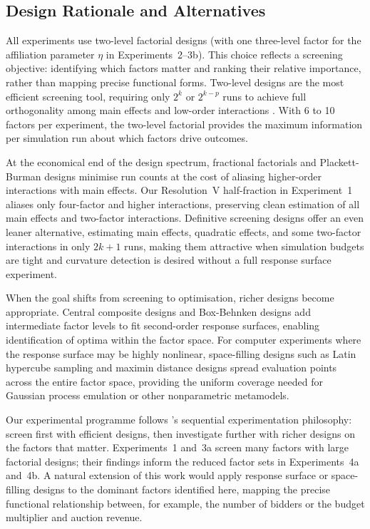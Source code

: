 \subsection{Design Rationale and Alternatives}

All experiments use two-level factorial designs (with one three-level factor for the affiliation parameter $\eta$ in Experiments~2--3b). This choice reflects a screening objective: identifying which factors matter and ranking their relative importance, rather than mapping precise functional forms. Two-level designs are the most efficient screening tool, requiring only $2^k$ or $2^{k-p}$ runs to achieve full orthogonality among main effects and low-order interactions \citep{Box2005, Montgomery2017}. With 6 to 10 factors per experiment, the two-level factorial provides the maximum information per simulation run about which factors drive outcomes.

At the economical end of the design spectrum, fractional factorials and Plackett-Burman designs minimise run counts at the cost of aliasing higher-order interactions with main effects. Our Resolution~V half-fraction in Experiment~1 aliases only four-factor and higher interactions, preserving clean estimation of all main effects and two-factor interactions. Definitive screening designs \citep{JonesNachtsheim2011} offer an even leaner alternative, estimating main effects, quadratic effects, and some two-factor interactions in only $2k+1$ runs, making them attractive when simulation budgets are tight and curvature detection is desired without a full response surface experiment.

When the goal shifts from screening to optimisation, richer designs become appropriate. Central composite designs \citep{BoxWilson1951} and Box-Behnken designs \citep{BoxBehnken1960} add intermediate factor levels to fit second-order response surfaces, enabling identification of optima within the factor space. For computer experiments where the response surface may be highly nonlinear, space-filling designs such as Latin hypercube sampling \citep{McKayBeckmanConover1979} and maximin distance designs \citep{SantnerWilliamsNotz2018} spread evaluation points across the entire factor space, providing the uniform coverage needed for Gaussian process emulation or other nonparametric metamodels.

Our experimental programme follows \citeauthor{Box2005}'s sequential experimentation philosophy: screen first with efficient designs, then investigate further with richer designs on the factors that matter. Experiments~1 and~3a screen many factors with large factorial designs; their findings inform the reduced factor sets in Experiments~4a and~4b. A natural extension of this work would apply response surface or space-filling designs to the dominant factors identified here, mapping the precise functional relationship between, for example, the number of bidders or the budget multiplier and auction revenue.

